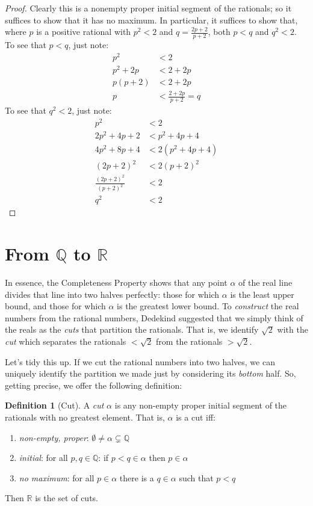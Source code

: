 \documentclass[10pt,a4paper]{article}
\theoremstyle{plain}
\theoremstyle{definition}
\newtheorem{defn}[thm]{Definition}
\theoremstyle{remark}
\newcommand*{\olfileid}[3]{}
\newcommand*{\olsection}[1]{\section*{#1}}
\providecommand{\Rat}{\mathbb{Q}}
\providecommand{\Real}{\mathbb{R}}
\begin{document}
\begin{proof}
Clearly this is a nonempty proper initial segment of the rationals; so
it suffices to show that it has no maximum. In particular, it suffices
to show that, where $p$ is a positive rational with $p^2 < 2$ and $q =
\frac{2p+2}{p+2}$, both $p < q$ and $q^2 < 2$. To see that $p < q$,
just note:
\begin{align*}
	p^2 &< 2\\
	p^2 + 2p &< 2 + 2p\\
	p(p + 2) &< 2 + 2p\\
	p &< \tfrac{2+2p}{p+2} = q
\end{align*}
To see that $q^2 < 2$, just note:
\begin{align*}
	p^2 &< 2\\
	2p^2 + 4p + 2 &< p^2 + 4p+ 4\\
	4p^2 + 8p + 4 &< 2(p^2 + 4p + 4)\\
	(2p+2)^2 & <2(p+2)^2\\
	\tfrac{(2p+2)^2}{(p+2)^2} &< 2\\
	q^2 &< 2
\end{align*}
\end{proof}
%


\olfileid{sfr}{arith}{cuts}
\olsection{From $\Rat$ to $\Real$}

In essence, the Completeness Property shows that any point $\alpha$ of
the real line divides that line into two halves perfectly: those for
which $\alpha$ is the least upper bound, and those for which $\alpha$
is the greatest lower bound. To \emph{construct} the real numbers from
the rational numbers, Dedekind suggested that we simply think of the
reals as the \emph{cuts} that partition the rationals. That is, we
identify $\sqrt{2}$ with the \emph{cut} which separates the rationals
$< \sqrt{2}$ from the rationals $> \sqrt{2}$. 

Let's tidy this up. If we cut the rational numbers into two halves, we
can uniquely identify the partition we made just by considering its
\emph{bottom} half. So, getting precise, we offer the following
definition:

\begin{defn}[Cut] 
A \emph{cut} $\alpha$ is any non-empty proper
initial segment of the rationals with no greatest element. That is,
$\alpha$ is a cut iff:
\begin{enumerate}
	\item \emph{non-empty, proper}: $\emptyset \neq \alpha \subsetneq \Rat$
	\item \emph{initial}: for all $p,q \in \Rat$: if $p < q \in \alpha$ then $p \in \alpha$
	\item \emph{no maximum}: for all $p \in \alpha$ there is a $q \in \alpha$ such that $p < q$ 
\end{enumerate} 
Then $\Real$ is the set of cuts. 
\end{defn}
\end{document}
